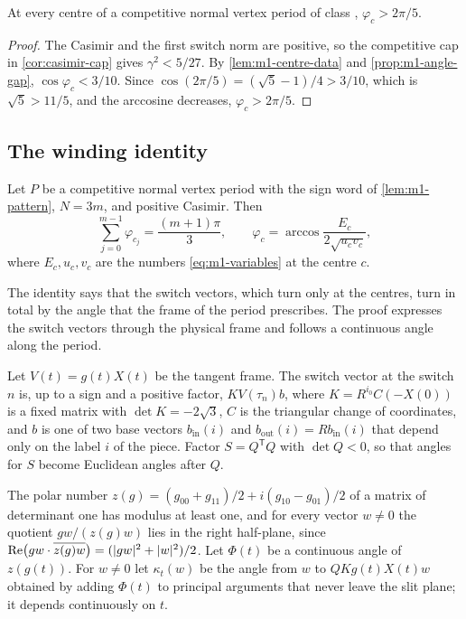 \begin{corollary}\label{cor:m1-angle}
  At every centre of a competitive normal vertex period of class , $\varphi_c>2\pi/5$.
\end{corollary}

\begin{proof}
  The Casimir and the first switch norm are positive, so the competitive cap in
  \cref{cor:casimir-cap} gives $\gamma^2<5/27$. By \cref{lem:m1-centre-data} and
  \cref{prop:m1-angle-gap}, $\cos\varphi_c<3/10$. Since $\cos(2\pi/5)=(\sqrt5-1)/4>3/10$, which
  is $\sqrt5>11/5$, and the arccosine decreases, $\varphi_c>2\pi/5$.
\end{proof}

\subsection{The winding identity}

\begin{proposition}\label{prop:m1-winding}
  Let $P$ be a competitive normal vertex period with the sign word of \cref{lem:m1-pattern}, $N=3m$,
  and positive Casimir. Then
  \[
    \sum_{j=0}^{m-1}\varphi_{c_j}=\frac{(m+1)\pi}3,\qquad
    \varphi_c=\arccos\frac{E_c}{2\sqrt{u_cv_c}},
  \]
  where $E_c,u_c,v_c$ are the numbers \eqref{eq:m1-variables} at the centre $c$.
\end{proposition}

The identity says that the switch vectors, which turn only at the centres, turn in total by the
angle that the frame of the period prescribes. The proof expresses the switch vectors through the
physical frame and follows a continuous angle along the period.

 Let $V(t)=g(t)X(t)$ be the tangent frame. The
switch vector at the switch $n$ is, up to a sign and a positive factor, $KV(\tau_n)b$, where
$K=R^{i_0}C(-X(0))$ is a fixed matrix with $\det K=-2\sqrt3$, $C$ is the triangular change of
coordinates, and $b$ is one of two base vectors $b_{\mathrm{in}}(i)$ and
$b_{\mathrm{out}}(i)=Rb_{\mathrm{in}}(i)$ that depend only on the label $i$ of the piece. Factor
$S=Q^{\mathsf T}Q$ with $\det Q<0$, so that angles for $S$ become Euclidean angles after $Q$.

 The polar number $z(g)=(g_{00}+g_{11})/2+i(g_{10}-g_{01})/2$ of a
matrix of determinant one has modulus at least one, and for every vector $w\ne0$ the quotient
$gw/(z(g)w)$ lies in the right half-plane, since
$\operatorname{Re}\bigl(gw\cdot\overline{z(g)w}\bigr)=(\lvert gw\rvert^2+\lvert w\rvert^2)/2$. Let $\Phi(t)$ be a
continuous angle of $z(g(t))$. For $w\ne0$ let $\kappa_t(w)$ be the angle from $w$ to
$QKg(t)X(t)w$ obtained by adding $\Phi(t)$ to principal arguments that never leave the slit
plane; it depends continuously on $t$.


